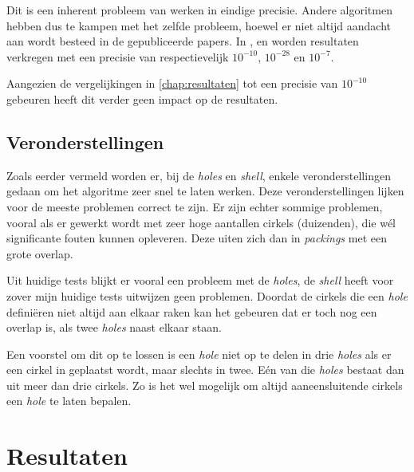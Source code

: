\documentclass[12pt,a4paper,oneside]{book}
\begin{document}
{Dit is een inherent probleem van werken in eindige precisie.
Andere algoritmen hebben dus te kampen met het zelfde probleem, hoewel er niet altijd aandacht aan wordt besteed in de gepubliceerde papers.
In \cite{akeb2006basic}, \cite{ye2013iterated} en \cite{m2013packing} worden resultaten verkregen met een precisie van respectievelijk $10^{-10}$, $10^{-28}$ en $10^{-7}$. %


Aangezien de vergelijkingen in \autoref{chap:resultaten} tot een precisie van $10^{-10}$ gebeuren heeft dit verder geen impact op de resultaten. %

\section{Veronderstellingen}

Zoals eerder vermeld worden er, bij de \textit{holes} en \textit{shell}, enkele veronderstellingen gedaan om het algoritme zeer snel te laten werken.
Deze veronderstellingen lijken voor de meeste problemen correct te zijn.
Er zijn echter sommige problemen, vooral als er gewerkt wordt met zeer hoge aantallen cirkels (duizenden), die wél significante fouten kunnen opleveren.
Deze uiten zich dan in \textit{packings} met een grote overlap.

Uit huidige tests blijkt er vooral een probleem met de \textit{holes}, de \textit{shell} heeft voor zover mijn huidige tests uitwijzen geen problemen.
Doordat de cirkels die een \textit{hole} definiëren niet altijd aan elkaar raken kan het gebeuren dat er toch nog een overlap is, als twee \textit{holes} naast elkaar staan.

Een voorstel om dit op te lossen is een \textit{hole} niet op te delen in drie \textit{holes} als er een cirkel in geplaatst wordt, maar slechts in twee.
Eén van die \textit{holes} bestaat dan uit meer dan drie cirkels.
Zo is het wel mogelijk om altijd aaneensluitende cirkels een \textit{hole} te laten bepalen. %

\chapter{Resultaten} \label{chap:resultaten}

}
\end{document}
